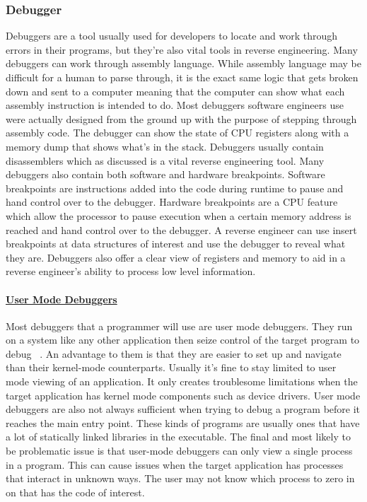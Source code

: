 \subsubsection{Debugger}
Debuggers are a tool usually used for developers to locate and work through errors in their programs, but they’re also vital tools in reverse engineering. 
Many debuggers can work through assembly language. 
While assembly language may be difficult for a human to parse through, it is the exact same logic that gets broken down and sent to a computer meaning that the computer can show what each assembly instruction is intended to do. 
Most debuggers software engineers use were actually designed from the ground up with the purpose of stepping through assembly code. 
The debugger can show the state of CPU registers along with a memory dump that shows what’s in the stack. 
Debuggers usually contain disassemblers which as discussed is a vital reverse engineering tool. 
Many debuggers also contain both software and hardware breakpoints. 
Software breakpoints are instructions added into the code during runtime to pause and hand control over to the debugger. 
Hardware breakpoints are a CPU feature which allow the processor to pause execution when a certain memory address is reached and hand control over to the debugger. 
A reverse engineer can use insert breakpoints at data structures of interest and use the debugger to reveal what they are. 
Debuggers also offer a clear view of registers and memory to aid in a reverse engineer's ability to process low level information.

\paragraph{\underline{User Mode Debuggers}}
Most debuggers that a programmer will use are user mode debuggers.
They run on a system like any other application then seize control of the target program to debug ~\cite{Reversing}.
An advantage to them is that they are easier to set up and navigate than their kernel-mode counterparts.
Usually it’s fine to stay limited to user mode viewing of an application. 
It only creates troublesome limitations when the target application has kernel mode components such as device drivers. 
User mode debuggers are also not always sufficient when trying to debug a program before it reaches the main entry point. 
These kinds of programs are usually ones that have a lot of statically linked libraries in the executable. 
The final and most likely to be problematic issue is that user-mode debuggers can only view a single process in a program. 
This can cause issues when the target application has processes that interact in unknown ways. 
The user may not know which process to zero in on that has the code of interest.

